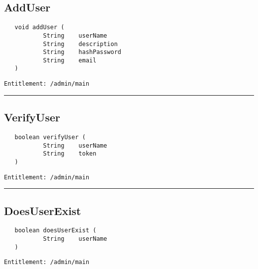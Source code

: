 \subsection{AddUser}
\label{Api:AddUser}
\begin{verbatim}
   void addUser (
           String    userName
           String    description
           String    hashPassword
           String    email
   )
\end{verbatim}
\begin{Verbatim}[fontsize=\small, formatcom=\color{Maroon}]
  Entitlement: /admin/main
\end{Verbatim}



\rule{12cm}{2pt}
\subsection{VerifyUser}
\label{Api:VerifyUser}
\begin{verbatim}
   boolean verifyUser (
           String    userName
           String    token
   )
\end{verbatim}
\begin{Verbatim}[fontsize=\small, formatcom=\color{Maroon}]
  Entitlement: /admin/main
\end{Verbatim}



\rule{12cm}{2pt}
\subsection{DoesUserExist}
\label{Api:DoesUserExist}
\begin{verbatim}
   boolean doesUserExist (
           String    userName
   )
\end{verbatim}
\begin{Verbatim}[fontsize=\small, formatcom=\color{Maroon}]
  Entitlement: /admin/main
\end{Verbatim}



